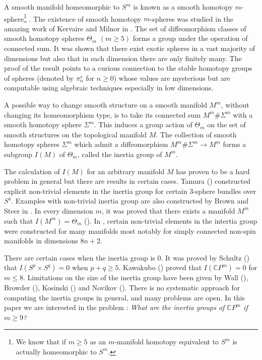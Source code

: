 \documentclass[a4paper,leqno,12pt]{amsart}
\theoremstyle{plain}
\theoremstyle{definition}
\numberwithin{equation}{section}
\begin{document}
A smooth manifold homeomorphic to $S^m$ is known as a smooth homotopy $m$-sphere\footnote{We know that if $m\geq 5$ as an $m$-manifold homotopy equivalent to $S^m$ is actually homeomorphic to $S^m$.} . The existence of smooth homotopy $m$-spheres was studied in the amazing work of Kervaire and Milnor in \cite{KM63}. The set of diffeomorphism classes of smooth homotopy spheres $\Theta_m$ $(m\geq 5)$ forms a group under the operation of connected sum. It was shown that there exist exotic spheres in a vast majority of dimensions but also that in each dimension there are only finitely many. The proof of the result points to a curious connection to the stable homotopy groups of spheres (denoted by $\pi_n^s$ for $n\geq 0$) whose values are mysterious but are computable using algebraic techniques especially in low dimensions. 

A possible way to change smooth structure on a smooth manifold $M^m$, without changing its homeomorphism type, is to take its connected sum $M^m\#\Sigma^m$ with a smooth homotopy sphere $\Sigma^m$. This induces a group action of $\Theta_m$ on the set of smooth structures on the topological manifold $M$. The collection of smooth homotopy spheres $\Sigma^m$  which admit a diffeomorphism $M^m\#\Sigma^m\to M^m$ forms a subgroup $I(M)$ of $\Theta_m$, called the inertia group of $M^m$. 

The calculation of $I(M)$ for an arbitrary manifold $M$ has proven to be a hard problem in general but there are results in certain cases. Tamura (\cite{Tam62}) constructed explicit non-trivial elements in the inertia group for certain $3$-sphere bundles over $S^4$. Examples with non-trivial inertia group are also constructed by Brown and Steer in \cite{BS65}. In every dimension $m$, it was proved that there exists a manifold $M^m$ such that $I(M^m)=\Theta_m$ (\cite{Win75}). In \cite{lev70}, certain non-trivial elements in the intertia group were constructed for many manifolds most notably for simply connected non-spin manifolds in dimensions $8n+2$. 

There are certain cases when the inertia group is $0$. It was proved by Schultz (\cite{Sch71})   that $I(S^p\times S^q)=0$ when $p+q\geq 5$. Kawakubo (\cite{Kaw68}) proved that $I(\mathbb{C}P^m)=0$ for $m\leq 8$. Limitations on the size of the inertia group have been given by Wall (\cite{Wal62}), Browder (\cite{Bro65}), Kosinski (\cite{Kos67}) and Novikov (\cite{Nov65}). There is no systematic approach for computing the inertia groups in general, and many problems are  open. In this paper we are interested in the problem : {\it What are the inertia groups of ${\mathbb{C}} P^m$ if $m\geq 9$?}
\end{document}
